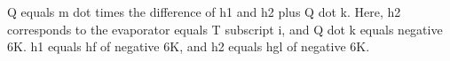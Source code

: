 Q equals m dot times the difference of h1 and h2 plus Q dot k. Here, h2 corresponds to the evaporator equals T subscript i, and Q dot k equals negative 6K. h1 equals hf of negative 6K, and h2 equals hgl of negative 6K.